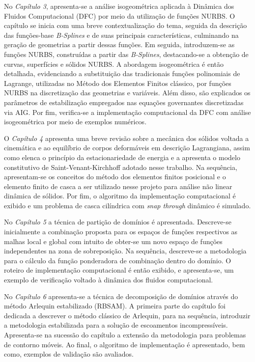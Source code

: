 No \textit{Capítulo 3}, apresenta-se a análise isogeométrica aplicada à Dinâmica dos Fluidos Computacional (DFC) por meio da utilização de funções NURBS. O capítulo se inicia com uma breve contextualização do tema, seguida da descrição das funções-base \textit{B-Splines} e de suas principais características, culminando na geração de geometrias a partir dessas funções. Em seguida, introduzem-se as funções NURBS, construídas a partir das \textit{B-Splines}, destacando-se a obtenção de curvas, superfícies e sólidos NURBS. A abordagem isogeométrica é então detalhada, evidenciando a substituição das tradicionais funções polinomiais de Lagrange, utilizadas no Método dos Elementos Finitos clássico, por funções NURBS na discretização das geometrias e variáveis. Além disso, são explicados os parâmetros de estabilização empregados nas equações governantes discretizadas via AIG. Por fim, verifica-se a implementação computacional da DFC com análise isogeométrica por meio de exemplos numéricos.

O \textit{Capítulo 4} apresenta uma breve revisão sobre a mecânica dos sólidos voltada a cinemática e ao equilíbrio de corpos deformáveis em descrição Lagrangiana, assim como elenca o princípio da estacionariedade de energia e a apresenta o modelo constitutivo de Saint-Venant-Kirchhoff adotado nesse trabalho. Na sequência, apresentam-se os conceitos do método dos elementos finitos posicional e o elemento finito de casca a ser utilizado nesse projeto para análise não linear dinâmica de sólidos. Por fim, o algoritmo da implementação computacional é exibido e um problema de casca cilíndrica com \textit{snap through} dinâmico é simulado.

No \textit{Capítulo 5} a técnica de partição de domínios é apresentada.  Descreve-se inicialmente a combinação proposta para os espaços de funções respectivos as malhas local e global com intuito de obter-se um novo espaço de funções independentes na zona de sobreposição. Na sequência, descreve-se a metodologia para o cálculo da função ponderadora de combinação dentro do domínio.
O roteiro de implementação computacional é então exibido, e apresenta-se, um exemplo de verificação voltado à dinâmica dos fluidos computacional.

No \textit{Capítulo 6} apresenta-se a técnica de decomposição de domínios através do método Arlequin estabilizado (RBSAM). A primeira parte do capítulo foi dedicada a descrever o método clássico de Arlequin, para na sequência, introduzir a metodologia estabilizada para a solução de escoamentos incompressíveis. Apresenta-se na sucessão do capítulo a extensão da metodologia para problemas de contorno móveis. Ao final, o algoritmo de implementação é apresentado, bem como, exemplos de validação são avaliados.

